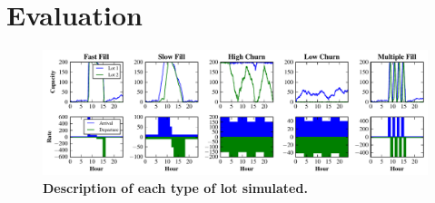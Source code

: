 \section{Evaluation}
\label{sec-evaluation}

\begin{figure}
\centering
\includegraphics[width=\textwidth]{./simulator/figures/lots.pdf}

\caption{\textbf{Description of each type of lot simulated.}}

\label{fig-lotsdescription}
\end{figure}
